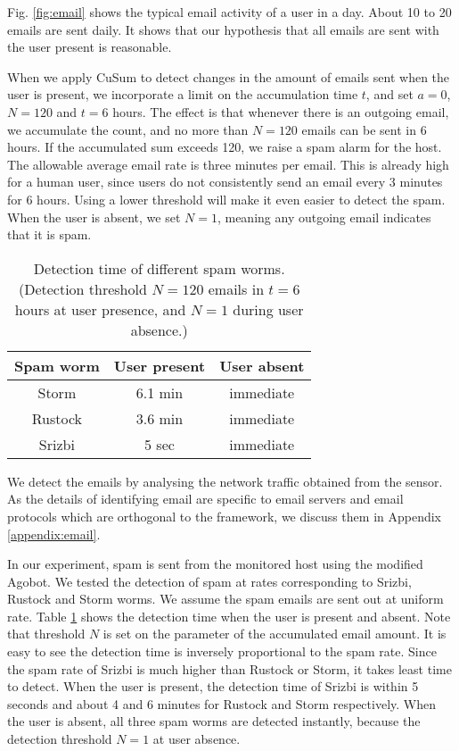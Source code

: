 Fig. \ref{fig:email} shows the typical email activity of a
user in a day. About 10 to 20 emails are sent daily.
It shows that our hypothesis that all emails are sent with the
user present is reasonable.

When we apply CuSum to detect changes in the amount of emails sent when
the user is present, we incorporate a limit on the accumulation time
$t$, and set $a=0$, $N=120$ and $t=6$ hours. The effect is that
whenever there is an outgoing email, we accumulate the count, and no
more than $N=120$ emails can be sent in 6 hours. If the accumulated sum
exceeds 120, we raise a spam alarm for the host. The allowable
average email rate is three minutes per email. This is already high for a
human user, since users do not consistently send an email every 3
minutes for 6 hours. Using a lower threshold will make it even easier
to detect the spam.
When the user is absent, we set $N=1$, meaning any
outgoing email indicates that it is spam.


\begin{table}[!t]
  \centering
  \begin{tabular}{|c|c|c|}
  \hline
  Spam worm  & User present & User absent \\
  \hline
  Storm & 6.1 min & immediate \\
  \hline
  Rustock & 3.6 min & immediate \\
  \hline
  Srizbi & 5 sec & immediate \\ [0.5ex]
  \hline
  \end{tabular}
  \caption{Detection time of different spam worms. (Detection threshold $N=120$ emails in $t=6$ hours at user presence, and $N=1$ during user absence.)}
  \label{tbl:detect-spam}
\end{table}

We detect the emails by analysing the network traffic obtained from
the sensor. As the details of identifying email are specific to email
servers and email protocols which are orthogonal to the framework,
we discuss them in Appendix \ref{appendix:email}.

In our experiment, spam is sent from the monitored host using the
modified Agobot.
We tested the detection of spam at rates corresponding to Srizbi,
Rustock and Storm worms.
We assume the spam emails are sent out at uniform rate.
Table \ref{tbl:detect-spam} shows the
detection time when the user is present and absent.
Note that threshold $N$ is set on the parameter of the accumulated
email amount. It is easy to see the detection time is inversely
proportional to the spam rate. Since the spam rate of Srizbi is much
higher than Rustock or Storm, it takes least time to detect. When
the user is present, the detection time of Srizbi is within 5 seconds
and about 4 and 6 minutes for Rustock and Storm respectively.
When the user is absent, all three spam worms are detected
instantly, because the detection threshold $N=1$ at user absence.

